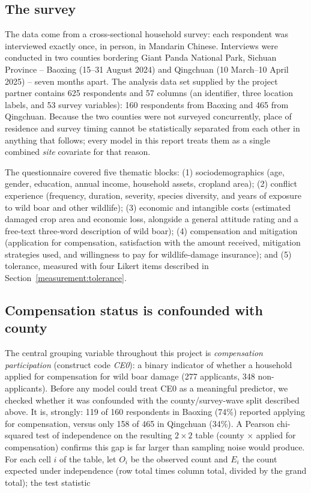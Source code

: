 \subsection{The survey}
\label{data:survey}

The data come from a cross-sectional household survey: each respondent was
interviewed exactly once, in person, in Mandarin Chinese. Interviews were
conducted in two counties bordering Giant Panda National Park, Sichuan
Province -- Baoxing (15--31 August 2024) and Qingchuan (10 March--10 April
2025) -- seven months apart. The analysis data set supplied by the project partner contains 625
respondents and 57 columns (an identifier, three location labels, and 53
survey variables): 160 respondents from Baoxing and 465 from Qingchuan. Because
the two counties were not surveyed concurrently, place of residence and survey
timing cannot be statistically separated from each other in anything that
follows; every model in this report treats them as a single combined
\emph{site} covariate for that reason.

The questionnaire covered five thematic blocks: (1) sociodemographics (age,
gender, education, annual income, household assets, cropland area); (2)
conflict experience (frequency, duration, severity, species diversity, and
years of exposure to wild boar and other wildlife); (3) economic and
intangible costs (estimated damaged crop area and economic loss, alongside a
general attitude rating and a free-text three-word description of wild boar);
(4) compensation and mitigation (application for compensation, satisfaction
with the amount received, mitigation strategies used, and willingness to pay
for wildlife-damage insurance); and (5) tolerance, measured with four Likert
items described in Section~\ref{measurement:tolerance}.

\subsection{Compensation status is confounded with county}
\label{data:confound}

The central grouping variable throughout this project is \emph{compensation
participation} (construct code \emph{CE0}): a binary indicator of whether a
household applied for compensation for wild boar damage (277 applicants, 348
non-applicants). Before any model could treat CE0 as a meaningful predictor, we
checked whether it was confounded with the county/survey-wave split described
above. It is, strongly: 119 of 160 respondents in Baoxing (74\%) reported
applying for compensation, versus only 158 of 465 in Qingchuan (34\%). A
Pearson chi-squared test of independence on the resulting $2\times2$ table
(county $\times$ applied for compensation) confirms this gap is far larger than
sampling noise would produce. For each cell $i$ of the table, let $O_i$ be
the observed count and $E_i$ the count expected under independence (row
total times column total, divided by the grand total); the test statistic

